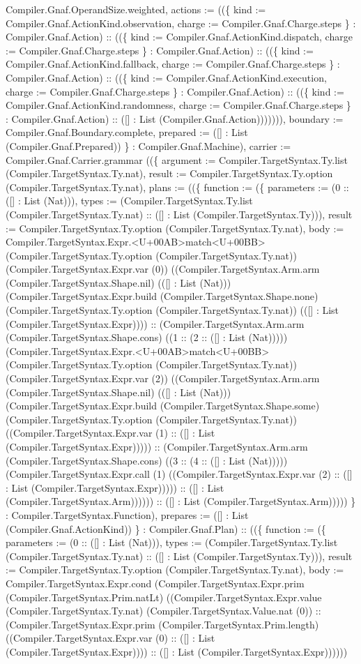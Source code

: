 \documentclass[11pt]{article}
\begin{document}
Compiler.Gnaf.OperandSize.weighted, actions := ((\{ kind := Compiler.Gnaf.ActionKind.observation, charge := Compiler.Gnaf.Charge.steps \} : Compiler.Gnaf.Action) :: ((\{ kind := Compiler.Gnaf.ActionKind.dispatch, charge := Compiler.Gnaf.Charge.steps \} : Compiler.Gnaf.Action) :: ((\{ kind := Compiler.Gnaf.ActionKind.fallback, charge := Compiler.Gnaf.Charge.steps \} : Compiler.Gnaf.Action) :: ((\{ kind := Compiler.Gnaf.ActionKind.execution, charge := Compiler.Gnaf.Charge.steps \} : Compiler.Gnaf.Action) :: ((\{ kind := Compiler.Gnaf.ActionKind.randomness, charge := Compiler.Gnaf.Charge.steps \} : Compiler.Gnaf.Action) :: ([] : List (Compiler.Gnaf.Action))))))), boundary := Compiler.Gnaf.Boundary.complete, prepared := ([] : List (Compiler.Gnaf.Prepared)) \} : Compiler.Gnaf.Machine), carrier := Compiler.Gnaf.Carrier.grammar ((\{ argument := Compiler.TargetSyntax.Ty.list (Compiler.TargetSyntax.Ty.nat), result := Compiler.TargetSyntax.Ty.option (Compiler.TargetSyntax.Ty.nat), plans := ((\{ function := (\{ parameters := (0 :: ([] : List (Nat))), types := (Compiler.TargetSyntax.Ty.list (Compiler.TargetSyntax.Ty.nat) :: ([] : List (Compiler.TargetSyntax.Ty))), result := Compiler.TargetSyntax.Ty.option (Compiler.TargetSyntax.Ty.nat), body := Compiler.TargetSyntax.Expr.<U+00AB>match<U+00BB> (Compiler.TargetSyntax.Ty.option (Compiler.TargetSyntax.Ty.nat)) (Compiler.TargetSyntax.Expr.var (0)) ((Compiler.TargetSyntax.Arm.arm (Compiler.TargetSyntax.Shape.nil) (([] : List (Nat))) (Compiler.TargetSyntax.Expr.build (Compiler.TargetSyntax.Shape.none) (Compiler.TargetSyntax.Ty.option (Compiler.TargetSyntax.Ty.nat)) (([] : List (Compiler.TargetSyntax.Expr)))) :: (Compiler.TargetSyntax.Arm.arm (Compiler.TargetSyntax.Shape.cons) ((1 :: (2 :: ([] : List (Nat))))) (Compiler.TargetSyntax.Expr.<U+00AB>match<U+00BB> (Compiler.TargetSyntax.Ty.option (Compiler.TargetSyntax.Ty.nat)) (Compiler.TargetSyntax.Expr.var (2)) ((Compiler.TargetSyntax.Arm.arm (Compiler.TargetSyntax.Shape.nil) (([] : List (Nat))) (Compiler.TargetSyntax.Expr.build (Compiler.TargetSyntax.Shape.some) (Compiler.TargetSyntax.Ty.option (Compiler.TargetSyntax.Ty.nat)) ((Compiler.TargetSyntax.Expr.var (1) :: ([] : List (Compiler.TargetSyntax.Expr))))) :: (Compiler.TargetSyntax.Arm.arm (Compiler.TargetSyntax.Shape.cons) ((3 :: (4 :: ([] : List (Nat))))) (Compiler.TargetSyntax.Expr.call (1) ((Compiler.TargetSyntax.Expr.var (2) :: ([] : List (Compiler.TargetSyntax.Expr))))) :: ([] : List (Compiler.TargetSyntax.Arm)))))) :: ([] : List (Compiler.TargetSyntax.Arm))))) \} : Compiler.TargetSyntax.Function), prepares := ([] : List (Compiler.Gnaf.ActionKind)) \} : Compiler.Gnaf.Plan) :: ((\{ function := (\{ parameters := (0 :: ([] : List (Nat))), types := (Compiler.TargetSyntax.Ty.list (Compiler.TargetSyntax.Ty.nat) :: ([] : List (Compiler.TargetSyntax.Ty))), result := Compiler.TargetSyntax.Ty.option (Compiler.TargetSyntax.Ty.nat), body := Compiler.TargetSyntax.Expr.cond (Compiler.TargetSyntax.Expr.prim (Compiler.TargetSyntax.Prim.natLt) ((Compiler.TargetSyntax.Expr.value (Compiler.TargetSyntax.Ty.nat) (Compiler.TargetSyntax.Value.nat (0)) :: (Compiler.TargetSyntax.Expr.prim (Compiler.TargetSyntax.Prim.length) ((Compiler.TargetSyntax.Expr.var (0) :: ([] : List (Compiler.TargetSyntax.Expr)))) :: ([] : List (Compiler.TargetSyntax.Expr)))))) 
\end{document}
